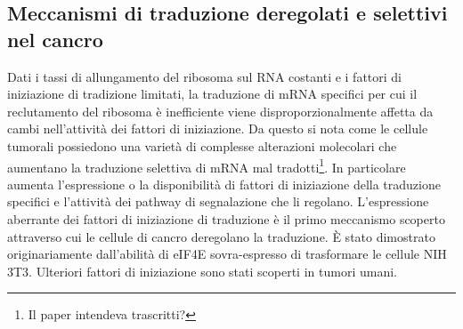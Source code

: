 	\subsection{Meccanismi di traduzione deregolati e selettivi nel cancro}
	Dati i tassi di allungamento del ribosoma sul RNA costanti e i fattori di iniziazione di tradizione limitati, la traduzione di mRNA specifici per cui il reclutamento del ribosoma \`e inefficiente viene disproporzionalmente affetta da cambi nell'attivit\`a dei fattori di iniziazione.
	Da questo si nota come le cellule tumorali possiedono una variet\`a di complesse alterazioni molecolari che aumentano la traduzione selettiva di mRNA mal tradotti\footnote{Il paper intendeva trascritti?}.
	In particolare aumenta l'espressione o la disponibilit\`a di fattori di iniziazione della traduzione specifici e l'attivit\`a dei pathway di segnalazione che li regolano.
	L'espressione aberrante dei fattori di iniziazione di traduzione \`e il primo meccanismo scoperto attraverso cui le cellule di cancro deregolano la traduzione.
	\`E stato dimostrato originariamente dall'abilit\`a di eIF4E sovra-espresso di trasformare le cellule NIH 3T3.
	Ulteriori fattori di iniziazione sono stati scoperti in tumori umani.

